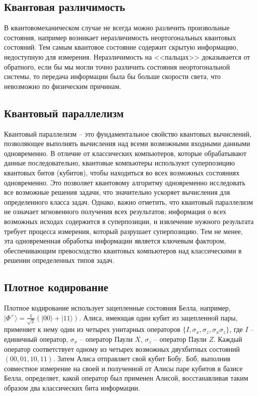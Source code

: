 \documentclass[12pt,a4paper]{article}
\begin{document}
	\subsection{Квантовая различимость}
	В квантовомеханическом случае не всегда можно различить произвольные состояния, например возникает неразличимость  неортогональных квантовых состояний. Тем самым квантовое состояние содержит скрытую информацию, недоступную для измерения. Неразличимость на <<пальцах>> доказывается от обратного, если бы мы могли точно различить состояния неортогональной системы, то передача информации была бы больше скорости света, что невозможно по физическим причинам\cite{1}.		
	\subsection{Квантовый параллелизм}
	
	Квантовый параллелизм -- это фундаментальное свойство квантовых вычислений, позволяющее выполнять вычисления над всеми возможными входными данными одновременно. В отличие от классических компьютеров, которые обрабатывают данные последовательно, квантовые компьютеры используют суперпозицию квантовых битов (кубитов), чтобы находиться во всех возможных состояниях одновременно. Это позволяет квантовому алгоритму одновременно исследовать все возможные решения задачи, что значительно ускоряет вычисления для определенного класса задач. Однако, важно отметить, что квантовый параллелизм не означает мгновенного получения всех результатов; информация о всех возможных исходах содержится в суперпозиции, и извлечение нужного результата требует процесса измерения, который разрушает суперпозицию. Тем не менее, эта одновременная обработка информации является ключевым фактором, обеспечивающим превосходство квантовых компьютеров над классическими в решении определенных типов задач.
	\subsection{Плотное кодирование}
	Плотное кодирование использует зацепленные состояния Белла, например, $|\Phi^+\rangle = \frac{1}{\sqrt{2}}(|00\rangle + |11\rangle)$. Алиса, имеющая один кубит из зацепленной пары, применяет к нему один из четырех унитарных операторов $\{I, \sigma_x, \sigma_z, \sigma_x \sigma_z\}$, где $I$ -- единичный оператор, $\sigma_x$ -- оператор Паули $X$, $\sigma_z$ -- оператор Паули $Z$. Каждый оператор соответствует одному из четырех возможных двухбитных состояний $(00, 01, 10, 11)$. Затем Алиса отправляет свой кубит Бобу. Боб, выполнив совместное измерение на своей и полученной от Алисы паре кубитов в базисе Белла, определяет, какой оператор был применен Алисой, восстанавливая таким образом два классических бита информации.
\end{document}

